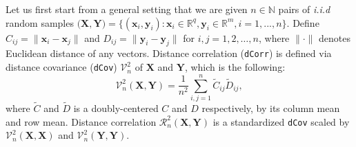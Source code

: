 \documentclass[12pt]{article}
\theoremstyle{definition}
\begin{document}
Let us first start from a general setting that we are given $n \in \mathbb{N}$ pairs of \textit{i.i.d} random samples $\big(  \mathbf{X}, \mathbf{Y}  \big)  = \{ (\mathbf{x}_{i}, \mathbf{y}_{i}) : \mathbf{x}_{i} \in \mathbb{R}^{q}, \mathbf{y}_{i} \in \mathbb{R}^{m}, i = 1,...,n \}$. Define $C_{ij} = \parallel \mathbf{x}_{i} - \mathbf{x}_{j} \parallel$ and $D_{ij} = \parallel \mathbf{y}_{i} - \mathbf{y}_{j} \parallel$ for $i,j=1,2, \ldots ,n$, where $\parallel \cdot \parallel$ denotes Euclidean distance of any vectors.   
Distance correlation (\texttt{dCorr}) is defined via distance covariance (\texttt{dCov}) $\mathcal{V}^2_{n}$ of $\mathbf{X}$ and $\mathbf{Y}$, which is the following: 
\begin{equation}	 
\mathcal{V}^2_{n}(\mathbf{X}, \mathbf{Y}) = \frac{1}{n^2} \sum\limits_{i,j=1}^{n} \tilde{C}_{ij} \tilde{D}_{ij},
\end{equation}
where $\tilde{C}$ and $\tilde{D}$ is a doubly-centered $C$ and $D$ respectively, by its column mean and row mean. Distance correlation $\mathcal{R}^{2}_{n}(\mathbf{X}, \mathbf{Y})$ is a standardized \texttt{dCov} scaled by $\mathcal{V}^2_{n}(\mathbf{X}, \mathbf{X})$ and $\mathcal{V}^2_{n}(\mathbf{Y}, \mathbf{Y}).$
\end{document}

